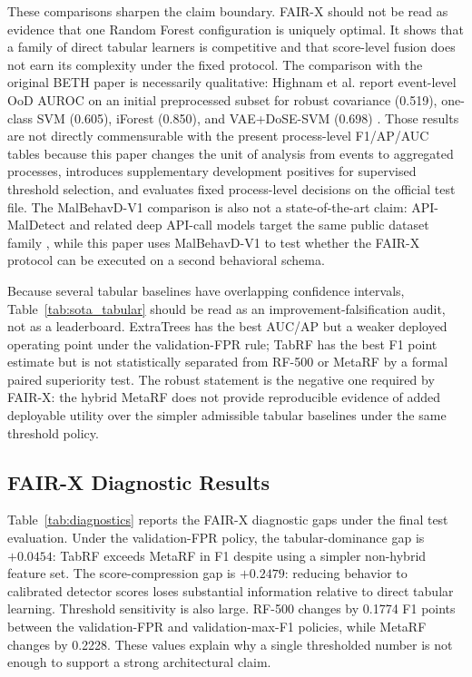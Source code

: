\documentclass[10pt,journal,compsoc]{IEEEtran}
\begin{document}
These comparisons sharpen the claim boundary. FAIR-X should not be read as evidence that one Random Forest configuration is uniquely optimal. It shows that a family of direct tabular learners is competitive and that score-level fusion does not earn its complexity under the fixed protocol. The comparison with the original BETH paper is necessarily qualitative: Highnam et al. report event-level OoD AUROC on an initial preprocessed subset for robust covariance (0.519), one-class SVM (0.605), iForest (0.850), and VAE+DoSE-SVM (0.698) \cite{highnam2021}. Those results are not directly commensurable with the present process-level F1/AP/AUC tables because this paper changes the unit of analysis from events to aggregated processes, introduces supplementary development positives for supervised threshold selection, and evaluates fixed process-level decisions on the official test file. The MalBehavD-V1 comparison is also not a state-of-the-art claim: API-MalDetect and related deep API-call models target the same public dataset family \cite{maniriho2023}, while this paper uses MalBehavD-V1 to test whether the FAIR-X protocol can be executed on a second behavioral schema.

Because several tabular baselines have overlapping confidence intervals, Table~\ref{tab:sota_tabular} should be read as an improvement-falsification audit, not as a leaderboard. ExtraTrees has the best AUC/AP but a weaker deployed operating point under the validation-FPR rule; TabRF has the best F1 point estimate but is not statistically separated from RF-500 or MetaRF by a formal paired superiority test. The robust statement is the negative one required by FAIR-X: the hybrid MetaRF does not provide reproducible evidence of added deployable utility over the simpler admissible tabular baselines under the same threshold policy.

\subsection{FAIR-X Diagnostic Results}

Table~\ref{tab:diagnostics} reports the FAIR-X diagnostic gaps under the final test evaluation. Under the validation-FPR policy, the tabular-dominance gap is $+0.0454$: TabRF exceeds MetaRF in F1 despite using a simpler non-hybrid feature set. The score-compression gap is $+0.2479$: reducing behavior to calibrated detector scores loses substantial information relative to direct tabular learning. Threshold sensitivity is also large. RF-500 changes by 0.1774 F1 points between the validation-FPR and validation-max-F1 policies, while MetaRF changes by 0.2228. These values explain why a single thresholded number is not enough to support a strong architectural claim.
\end{document}
